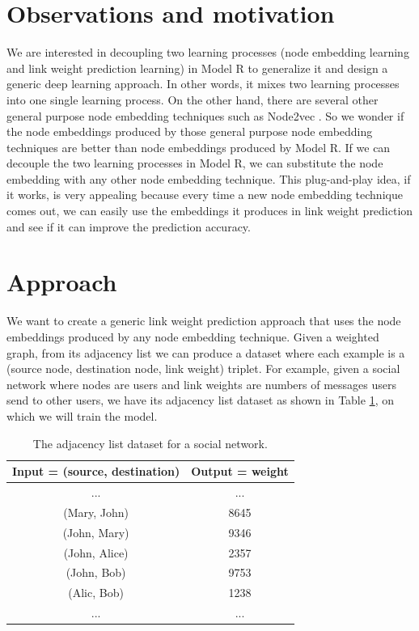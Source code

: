 \documentclass{article} %
\begin{document}
\section{Observations and motivation}
We are interested in decoupling two learning processes (node embedding learning and link weight prediction learning) in Model R to generalize it and design a generic deep learning approach.
In other words, it mixes two learning processes into one single learning process.
On the other hand, there are several other general purpose node embedding techniques such as Node2vec \citep{grover2016node2vec}.
So we wonder if the node embeddings produced by those general purpose node embedding techniques are better than node embeddings produced by Model R.
If we can decouple the two learning processes in Model R, we can substitute the node embedding with any other node embedding technique.
This plug-and-play idea, if it works, is very appealing because every time a new node embedding technique comes out, we can easily use the embeddings it produces in link weight prediction and see if it can improve the prediction accuracy.

\section{Approach}
We want to create a generic link weight prediction approach that uses the node embeddings produced by any node embedding technique.
Given a weighted graph, from its adjacency list we can produce a dataset where each example is a (source node, destination node, link weight) triplet.
For example, given a social network where nodes are users and link weights are numbers of messages users send to other users, we have its adjacency list dataset as shown in Table \ref{tab:link-list-dataset}, on which we will train the model.
\begin{table}[h] \centering
	\caption{The adjacency list dataset for a social network.}
	\begin{tabular}{cc} \\ \hline
		\textbf{Input = (source, destination)} & \textbf{Output = weight} \\ \hline
		...                        & ... \\ \hline
		(Mary, John) & 8645 \\ \hline
		(John, Mary) & 9346 \\ \hline
		(John, Alice) & 2357 \\ \hline
		(John, Bob) & 9753 \\ \hline
		(Alic, Bob) & 1238 \\ \hline
		...                        & ... \\ \hline
	\end{tabular}
	\label{tab:link-list-dataset}
\end{table}
\end{document}

